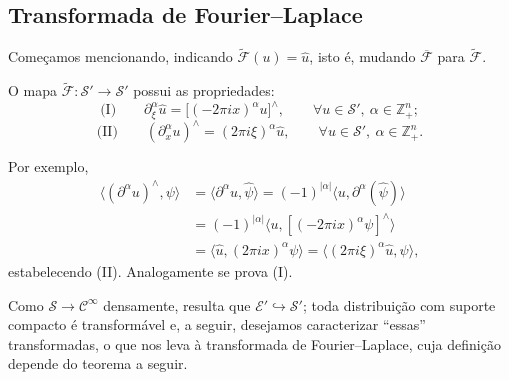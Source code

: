 \documentclass[../distribution_theory_notes.tex]{subfiles}
\begin{document}
\subsection{Transformada de Fourier--Laplace}

Começamos mencionando, indicando \(\widetilde{\mathcal{F}}(u)=\hat u\), isto é, mudando \(\overline{\mathcal{F}}\) para \(\widetilde{\mathcal{F}}\).

\begin{prop*}
	O mapa \(\widetilde{\mathcal{F}}:\mathcal{S}'\longrightarrow\mathcal{S}'\) possui as propriedades:
	\[
		\text{(I)}\qquad
		\partial_\xi^\alpha\hat u
		=\bigl[(-2\pi i x)^\alpha u\bigr]^\wedge,
		\qquad \forall u\in\mathcal{S}',\ \alpha\in\mathbb{Z}_+^n;
	\]
	\[
		\text{(II)}\qquad
		(\partial_x^\alpha u)^\wedge
		=(2\pi i\xi)^\alpha\hat u,
		\qquad \forall u\in\mathcal{S}',\ \alpha\in\mathbb{Z}_+^n.
	\]
\end{prop*}
\begin{proof*}
	Por exemplo,
	\begin{align*}
		\langle (\partial^\alpha u)^\wedge,\psi\rangle
		 & =\langle \partial^\alpha u,\hat\psi\rangle
		=(-1)^{|\alpha|}\langle u,\partial^\alpha(\hat\psi)\rangle                    \\
		 & =(-1)^{|\alpha|}\bigl\langle u,[(-2\pi i x)^\alpha\psi]^\wedge\bigr\rangle \\
		 & =\langle \hat u,(2\pi i x)^\alpha\psi\rangle
		=\langle (2\pi i\xi)^\alpha\hat u,\psi\rangle,
	\end{align*}
	estabelecendo (II). Analogamente se prova (I). \qedsymbol
\end{proof*}

\begin{tcolorbox}[
		skin=enhanced,
		title=Observação,
		fonttitle=\bfseries,
		colframe=black,
		colbacktitle=cyan!75!white,
		colback=cyan!15,
		colbacklower=black,
		coltitle=black,
		drop fuzzy shadow
	]
	Como \(\mathcal{S}\to\mathcal{C}^\infty\) densamente, resulta que \(\mathcal{E}'\hookrightarrow\mathcal{S}'\); toda distribuição com suporte compacto é transformável e, a seguir, desejamos caracterizar ``essas'' transformadas, o que nos leva à transformada de Fourier--Laplace, cuja definição depende do teorema a seguir.
\end{tcolorbox}
\end{document}
